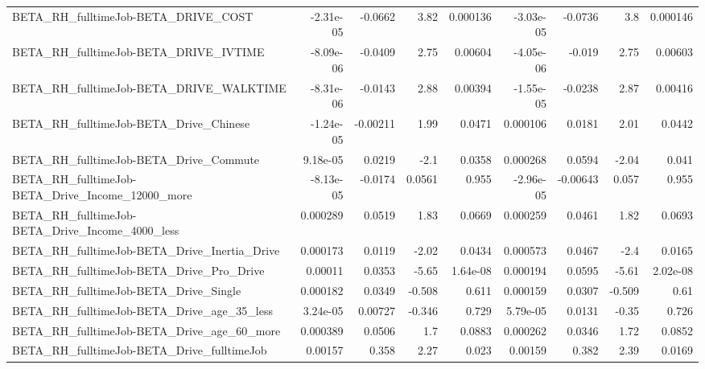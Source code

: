 \begin{tabular}{lrrrrrrrr}
BETA\_RH\_fulltimeJob-BETA\_DRIVE\_COST                &   -2.31e-05 &      -0.0662 &     3.82 & 0.000136 &  -3.03e-05 &     -0.0736 &          3.8 &      0.000146 \\
BETA\_RH\_fulltimeJob-BETA\_DRIVE\_IVTIME              &   -8.09e-06 &      -0.0409 &     2.75 &  0.00604 &  -4.05e-06 &      -0.019 &         2.75 &       0.00603 \\
BETA\_RH\_fulltimeJob-BETA\_DRIVE\_WALKTIME            &   -8.31e-06 &      -0.0143 &     2.88 &  0.00394 &  -1.55e-05 &     -0.0238 &         2.87 &       0.00416 \\
BETA\_RH\_fulltimeJob-BETA\_Drive\_Chinese             &   -1.24e-05 &     -0.00211 &     1.99 &   0.0471 &   0.000106 &      0.0181 &         2.01 &        0.0442 \\
BETA\_RH\_fulltimeJob-BETA\_Drive\_Commute             &    9.18e-05 &       0.0219 &     -2.1 &   0.0358 &   0.000268 &      0.0594 &        -2.04 &         0.041 \\
BETA\_RH\_fulltimeJob-BETA\_Drive\_Income\_12000\_more   &   -8.13e-05 &      -0.0174 &   0.0561 &    0.955 &  -2.96e-05 &    -0.00643 &        0.057 &         0.955 \\
BETA\_RH\_fulltimeJob-BETA\_Drive\_Income\_4000\_less    &    0.000289 &       0.0519 &     1.83 &   0.0669 &   0.000259 &      0.0461 &         1.82 &        0.0693 \\
BETA\_RH\_fulltimeJob-BETA\_Drive\_Inertia\_Drive       &    0.000173 &       0.0119 &    -2.02 &   0.0434 &   0.000573 &      0.0467 &         -2.4 &        0.0165 \\
BETA\_RH\_fulltimeJob-BETA\_Drive\_Pro\_Drive           &     0.00011 &       0.0353 &    -5.65 & 1.64e-08 &   0.000194 &      0.0595 &        -5.61 &      2.02e-08 \\
BETA\_RH\_fulltimeJob-BETA\_Drive\_Single              &    0.000182 &       0.0349 &   -0.508 &    0.611 &   0.000159 &      0.0307 &       -0.509 &          0.61 \\
BETA\_RH\_fulltimeJob-BETA\_Drive\_age\_35\_less         &    3.24e-05 &      0.00727 &   -0.346 &    0.729 &   5.79e-05 &      0.0131 &        -0.35 &         0.726 \\
BETA\_RH\_fulltimeJob-BETA\_Drive\_age\_60\_more         &    0.000389 &       0.0506 &      1.7 &   0.0883 &   0.000262 &      0.0346 &         1.72 &        0.0852 \\
BETA\_RH\_fulltimeJob-BETA\_Drive\_fulltimeJob         &     0.00157 &        0.358 &     2.27 &    0.023 &    0.00159 &       0.382 &         2.39 &        0.0169 \\

\end{tabular}
